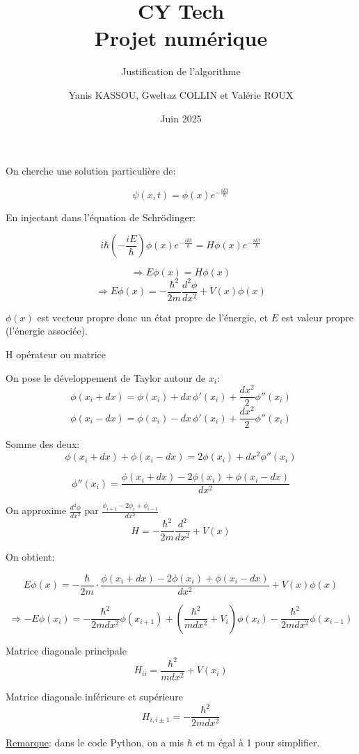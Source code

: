 \documentclass[12pt,a4paper]{article}
\date{Juin 2025}
\title{\textbf{CY Tech
\\{\Large Projet numérique}}}
\subtitle{Justification de l'algorithme}
\author{Yanis KASSOU, Gweltaz COLLIN et Valérie ROUX}
\begin{document}
\maketitle

On cherche une solution particulière de:

\[\psi(x,t) = \phi(x)e^{-\frac{iEt}{\hbar}}\]

En injectant dans l'équation de Schrödinger:

\[i\hbar\left(-\frac{iE}{\hbar}\right)\phi(x)e^{-\frac{iEt}{\hbar}} = H\phi(x)e^{-\frac{iEt}{\hbar}}\]

\[\Rightarrow E\phi(x) = H\phi(x)\]
\[\Rightarrow E\phi(x) = -\frac{\hbar^2}{2m}\frac{d^2\phi}{dx^2} + V(x)\phi(x)\]


$\phi(x)$ est vecteur propre donc un état propre de l'énergie,
et $E$ est valeur propre (l'énergie associée).

H opérateur ou matrice

On pose le développement de Taylor autour de $x_i$:
\[\phi(x_i+dx) = \phi(x_i) + dx\,\phi'(x_i) + \frac{dx^2}{2}\phi''(x_i)\]
\[\phi(x_i-dx) = \phi(x_i) - dx\,\phi'(x_i) + \frac{dx^2}{2}\phi''(x_i)\]

Somme des deux:
\[\phi(x_i+dx) + \phi(x_i-dx) = 2\phi(x_i) + dx^2\phi''(x_i)\]

\[\phi''(x_i) = \frac{\phi(x_i+dx)-2\phi(x_i)+\phi(x_i-dx)}{dx^2}\]

On approxime $\frac{d^2\phi}{dx^2}$ par $\frac{\phi_{i+1}-2\phi_i+\phi_{i-1}}{dx^2}$
\[H = -\frac{\hbar^2}{2m}\frac{d^2}{dx^2} + V(x)\]

On obtient:

\[E\phi(x) = -\frac{\hbar}{2m}\cdot\frac{\phi(x_i+dx)-2\phi(x_i)+\phi(x_i-dx)}{dx^2}+V(x)\phi(x)\]

\[\Rightarrow -E\phi(x_i) = -\frac{\hbar^2}{2mdx^2}\phi(x_{i+1})+(\frac{\hbar^2}{mdx^2}+V_i)\phi(x_i)-\frac{\hbar^2}{2mdx^2}\phi(x_{i-1})\]

Matrice diagonale principale
\[H_{ii} = \frac{\hbar^2}{mdx^2}+V(x_i)\]


Matrice diagonale inférieure et supérieure
\[H_{i,i\pm1} = -\frac{\hbar^2}{2mdx^2}\]

\underline{Remarque}: dans le code Python, on a mis $\hbar$ et m égal à 1 pour simplifier.
\end{document}
